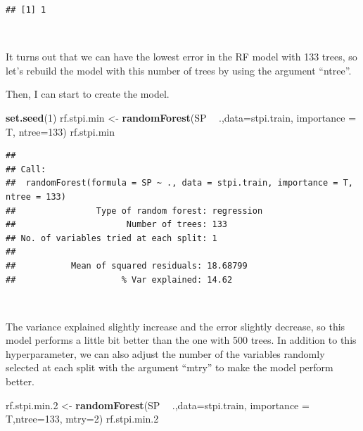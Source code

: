 \documentclass[
]{article}
\newenvironment{Shaded}{\begin{snugshade}}{\end{snugshade}}
\newcommand{\DataTypeTok}[1]{\textcolor[rgb]{0.13,0.29,0.53}{#1}}
\newcommand{\DecValTok}[1]{\textcolor[rgb]{0.00,0.00,0.81}{#1}}
\newcommand{\FloatTok}[1]{\textcolor[rgb]{0.00,0.00,0.81}{#1}}
\newcommand{\KeywordTok}[1]{\textcolor[rgb]{0.13,0.29,0.53}{\textbf{#1}}}
\newcommand{\NormalTok}[1]{#1}
\newcommand{\OperatorTok}[1]{\textcolor[rgb]{0.81,0.36,0.00}{\textbf{#1}}}
\newcommand{\StringTok}[1]{\textcolor[rgb]{0.31,0.60,0.02}{#1}}
\begin{document}
\begin{verbatim}
## [1] 1
\end{verbatim}

~

It turns out that we can have the lowest error in the RF model with 133
trees, so let's rebuild the model with this number of trees by using the
argument ``ntree''.

Then, I can start to create the model.

\begin{Shaded}
\begin{Highlighting}[]
\KeywordTok{set.seed}\NormalTok{(}\DecValTok{1}\NormalTok{)}
\NormalTok{rf.stpi.min <-}\StringTok{ }\KeywordTok{randomForest}\NormalTok{(SP }\OperatorTok{~}\StringTok{ }\NormalTok{.,}\DataTypeTok{data=}\NormalTok{stpi.train, }\DataTypeTok{importance =}\NormalTok{ T, }\DataTypeTok{ntree=}\DecValTok{133}\NormalTok{)}
\NormalTok{rf.stpi.min}
\end{Highlighting}
\end{Shaded}

\begin{verbatim}
## 
## Call:
##  randomForest(formula = SP ~ ., data = stpi.train, importance = T,      ntree = 133) 
##                Type of random forest: regression
##                      Number of trees: 133
## No. of variables tried at each split: 1
## 
##           Mean of squared residuals: 18.68799
##                     % Var explained: 14.62
\end{verbatim}

~

The variance explained slightly increase and the error slightly
decrease, so this model performs a little bit better than the one with
500 trees. In addition to this hyperparameter, we can also adjust the
number of the variables randomly selected at each split with the
argument ``mtry'' to make the model perform better.

\begin{Shaded}
\begin{Highlighting}[]
\NormalTok{rf.stpi.min}\FloatTok{.2}\NormalTok{ <-}\StringTok{ }\KeywordTok{randomForest}\NormalTok{(SP }\OperatorTok{~}\StringTok{ }\NormalTok{.,}\DataTypeTok{data=}\NormalTok{stpi.train, }\DataTypeTok{importance =}\NormalTok{ T,}\DataTypeTok{ntree=}\DecValTok{133}\NormalTok{, }\DataTypeTok{mtry=}\DecValTok{2}\NormalTok{)}
\NormalTok{rf.stpi.min}\FloatTok{.2}
\end{Highlighting}
\end{Shaded}
\end{document}

